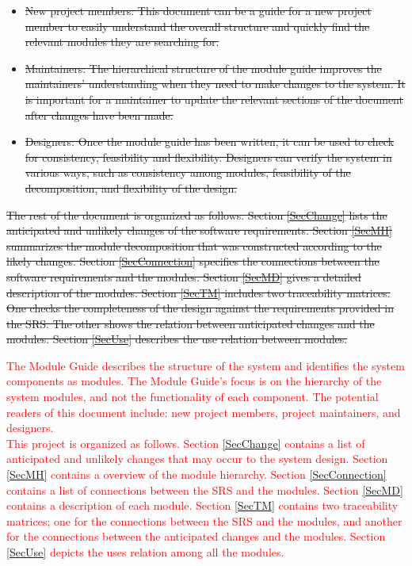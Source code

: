 \documentclass[12pt, titlepage]{article}
\begin{document}
\begin{itemize}
\item \sout{New project members: This document can be a guide for a new project member to easily understand the overall structure and quickly find the relevant modules they are searching for.}
\item \sout{Maintainers: The hierarchical structure of the module guide improves the maintainers' understanding when they need to make changes to the system. It is important for a maintainer to update the relevant sections of the document after changes have been made.}
\item \sout{Designers: Once the module guide has been written, it can be used to check for consistency, feasibility and flexibility. Designers can verify the system in various ways, such as consistency among modules, feasibility of the decomposition, and flexibility of the design.}
\end{itemize}

\sout{\noindent The rest of the document is organized as follows. Section \ref{SecChange} lists the anticipated and unlikely changes of the software requirements. Section \ref{SecMH} summarizes the module decomposition that was constructed according to the likely changes. Section \ref{SecConnection} specifies the connections between the software requirements and the modules. Section \ref{SecMD} gives a detailed description of the modules. Section \ref{SecTM} includes two traceability matrices. One checks the completeness of the design against the requirements provided in the SRS. The other shows the relation between anticipated changes and the modules. Section \ref{SecUse} describes the use relation between modules.}

\textcolor{red}{The Module Guide describes the structure of the system and identifies the system components as modules. The Module Guide's focus is on the hierarchy of the system modules, and not the functionality of each component. The potential readers of this document include: new project members, project maintainers, and designers.}\\

\textcolor{red}{This project is organized as follows. Section \ref{SecChange} contains a list of anticipated and unlikely changes that may occur to the system design. Section \ref{SecMH} contains a overview of the module hierarchy. Section \ref{SecConnection} contains a list of connections between the SRS and the modules. Section \ref{SecMD} contains a description of each module. Section \ref{SecTM} contains two traceability matrices; one for the connections between the SRS and the modules, and another for the connections between the anticipated changes and the modules. Section \ref{SecUse} depicts the uses relation among all the modules.}
\end{document}
